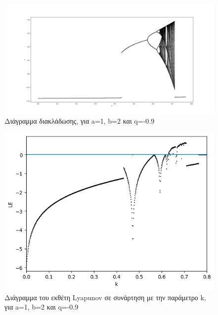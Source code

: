 \begin{figure}[h!]
	\centering
	\includegraphics[width=0.6\linewidth]{LateX images/graphs q09/g1}
	\caption{ Διάγραμμα διακλάδωσης, για a=1, b=2 και q=-0.9}
	\label{f:g14}
\end{figure}

\begin{figure}[h!]
	\centering
	\includegraphics[width=0.6\linewidth]{LateX images/graphs q09/g2}
	\caption{Διάγραμμα του εκθέτη Lyapunov σε συνάρτηση με την παράμετρο k, για a=1, b=2 και q=-0.9}
	\label{f:g15}
\end{figure}

